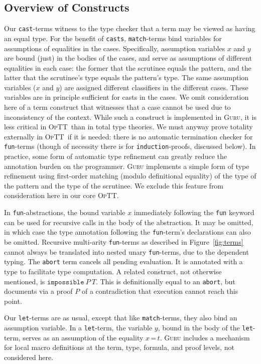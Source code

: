 \documentclass{fundam}
\newcommand{\optt}{\textsc{OpTT}}
\newcommand{\Eq}[0]{\texttt{=}}
\begin{document}
\subsection{Overview of Constructs}

Our \texttt{cast}-terms witness to the type checker that a term may be
viewed as having an equal type.  For the benefit of \texttt{casts},
\texttt{match}-terms bind variables for assumptions of equalities in
the cases.  Specifically, assumption variables $x$ and $y$ are bound
(just) in the bodies of the cases, and serve as assumptions of
different equalities in each case: the former that the scrutinee
equals the pattern, and the latter that the scrutinee's type equals
the pattern's type.  The same assumption variables ($x$ and $y$) are
assigned different classifiers in the different cases.  These
variables are in principle sufficient for casts in the cases.  We omit
consideration here of a term construct that witnesses that a case
cannot be used due to inconsistency of the context.  While such a
construct is implemented in \textsc{Guru}, it is less critical in
\optt\ than in total type theories.  We must anyway prove totality
externally in \optt\ if it is needed: there is no automatic
termination checker for \texttt{fun}-terms (though of necessity there
is for \texttt{induction}-proofs, discussed below).  In practice, some
form of automatic type refinement can greatly reduce the annotation
burden on the programmer.  \textsc{Guru} implements a simple form of
type refinement using first-order matching (modulo definitional
equality) of the type of the pattern and the type of the scrutinee.
We exclude this feature from consideration here in our core \optt.

In \texttt{fun}-abstractions, the bound variable $x$ immediately
following the \texttt{fun} keyword can be used for recursive calls in
the body of the abstraction.  It may be omitted, in which case the
type annotation following the \texttt{fun}-term's declarations can
also be omitted.  Recursive multi-arity \texttt{fun}-terms as
described in Figure~\ref{fig:terms} cannot always be translated into
nested unary \texttt{fun}-terms, due to the dependent typing.  The
\texttt{abort} term cancels all pending evaluation.  It is annotated
with a type to facilitate type computation.  A related construct, not
otherwise mentioned, is $\texttt{impossible}\ P\ T$.  This is
definitionally equal to an \texttt{abort}, but documents via a proof
$P$ of a contradiction that execution cannot reach this point.

Our \texttt{let}-terms are as usual, except that like
\texttt{match}-terms, they also bind an assumption variable.  In a
\texttt{let}-term, the variable $y$, bound in the body of the
\texttt{let}-term, serves as an assumption of the equality ${x\, \Eq\,
t}$.  \textsc{Guru} includes a mechanism for local macro definitions
at the term, type, formula, and proof levels, not considered here.
\end{document}
